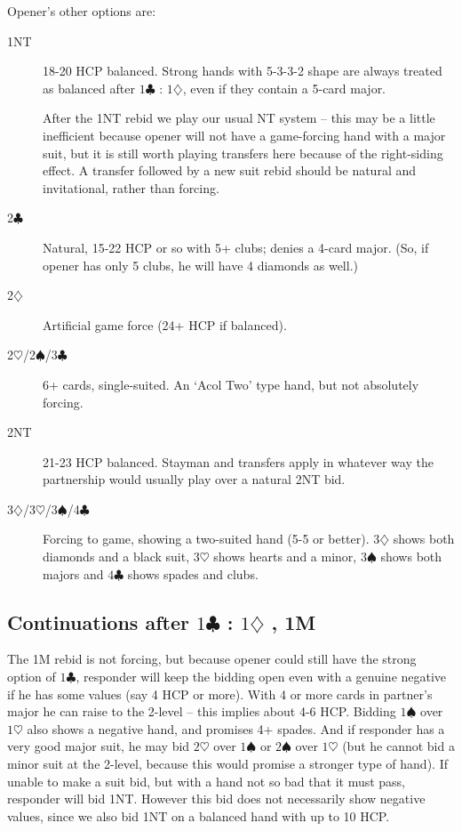 \documentclass{article}
\newcommand{\sz}{\spadesuit}
\newcommand{\hz}{\heartsuit}
\newcommand{\dz}{\diamondsuit}
\newcommand{\cz}{\clubsuit}
\begin{document}
Opener's other options are:
\begin{description}
\item[1NT] 18-20 HCP balanced. Strong hands with 5-3-3-2 shape are always treated as balanced after $1\cz$ : $1\dz$, even if they contain a 5-card major.

After the 1NT rebid we play our usual NT system -- this may be a little inefficient because opener will not have a game-forcing hand with a major suit, but it is still worth playing transfers here because of the right-siding effect. A transfer followed by a new suit rebid should be natural and invitational, rather than forcing.
\item[2$\cz$] Natural, 15-22 HCP or so with 5+ clubs; denies a 4-card major. (So, if opener has only 5 clubs, he will have 4 diamonds as well.)
\item[2$\dz$] Artificial game force (24+ HCP if balanced).
\item[2$\hz$/2$\sz$/3$\cz$] 6+ cards, single-suited. An `Acol Two' type hand, but not absolutely forcing.
\item[2NT] 21-23 HCP balanced. Stayman and transfers apply in whatever way the partnership would usually play over a natural 2NT bid.
\item[3$\dz$/3$\hz$/3$\sz$/4$\cz$] Forcing to game, showing a two-suited hand (5-5 or better). $3\dz$ shows both diamonds and a black suit, $3\hz$ shows hearts and a minor, $3\sz$ shows both majors and $4\cz$ shows spades and clubs.
\end{description}

\subsection{Continuations after $1\cz$ : $1\dz$ , 1M}

The 1M rebid is not forcing, but because opener could still have the strong option of $1\cz$, responder will keep the bidding open even with a genuine negative if he has some values (say 4 HCP or more). With 4 or more cards in partner's major he can raise to the 2-level -- this implies about 4-6 HCP. Bidding $1\sz$ over $1\hz$ also shows a negative hand, and promises 4+ spades. And if responder has a very good major suit, he may bid $2\hz$ over $1\sz$ or $2\sz$ over $1\hz$ (but he cannot bid a minor suit at the 2-level, because this would promise a stronger type of hand). If unable to make a suit bid, but with a hand not so bad that it must pass, responder will bid 1NT. However this bid does not necessarily show negative values, since we also bid 1NT on a balanced hand with up to 10 HCP.
\end{document}
